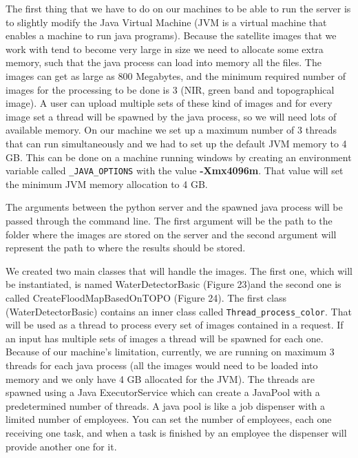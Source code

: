 \documentclass[12pt, a4paper]{report}
\begin{document}
\quad 
The first thing that we have to do on our machines to be able to run the server is to slightly modify the Java Virtual Machine (JVM is a virtual machine that enables a machine to run java programs). Because the satellite images that we work with tend to become very large in size we need to allocate some extra memory, such that the java process can load into memory all the files. The images can get as large as 800 Megabytes, and the minimum required number of images for the processing to be done is 3 (NIR, green band and topographical image). A user can upload multiple sets of these kind of images and for every image set a thread will be spawned by the java process, so we will need lots of available memory. On our machine we set up a maximum number of 3 threads that can run simultaneously and we had to set up the default JVM memory to 4 GB. This can be done on a machine running windows by  creating an environment variable called \texttt{\_JAVA\_OPTIONS} with the value \textbf{-Xmx4096m}. That value will set the minimum JVM memory allocation to 4 GB.
\par 

The arguments between the python server and the spawned java process will be passed through the command line. The first argument will be the path to the folder where the images are stored on the server and the second argument will represent the path to where the results should be stored.
\par 

We created two main classes that will handle the images. The first one, which will be instantiated, is named WaterDetectorBasic (Figure 23)and the second one is called CreateFloodMapBasedOnTOPO (Figure 24). The first class (WaterDetectorBasic) contains an inner class called \texttt{Thread\_process\_color}. That will be used as a thread to process every set of images contained in a request. If an input has multiple sets of images a thread will be spawned for each one. Because of our machine's limitation, currently, we are running on maximum 3 threads for each java process (all the images would need to be loaded into memory and we only have 4 GB allocated for the JVM). The threads are spawned using a Java ExecutorService which can create a JavaPool with a predetermined number of threads. A java pool is like a job dispenser with a limited number of employees. You can set the number of employees, each one receiving one task, and when a task is finished by an employee the dispenser will provide another one for it.
\end{document}
